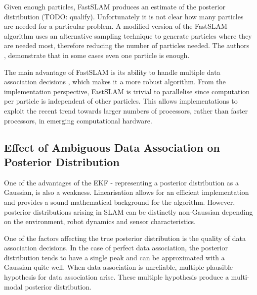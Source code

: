 Given enough particles, FastSLAM produces an estimate of the posterior
distribution (TODO: qualify). Unfortunately it is not clear how many
particles are needed for a particular problem. A modified version of
the FastSLAM algorithm \cite{fastslam2} uses an alternative sampling
technique to generate particles where they are needed most, therefore
reducing the number of particles needed. The authors \cite{fastslam2},
demonstrate that in some cases even one particle is enough.

The main advantage of FastSLAM is its ability to handle multiple data
association decisions \cite{Montemerlo2003}, which makes it a more
robust algorithm. From the implementation perspective, FastSLAM is
trivial to parallelise since computation per particle is independent
of other particles. This allows implementations to exploit the recent
trend towards larger numbers of processors, rather than faster
processors, in emerging computational hardware.

\subsection{Effect of Ambiguous Data Association on Posterior
  Distribution}
\label{sec:AmbiguousDA}

One of the advantages of the EKF - representing a posterior
distribution as a Gaussian, is also a weakness. Linearisation allows
for an efficient implementation and provides a sound mathematical
background for the algorithm. However, posterior distributions arising
in SLAM can be distinctly non-Gaussian depending on the environment,
robot dynamics and sensor characteristics.

One of the factors affecting the true posterior distribution is the
quality of data association decisions. In the case of perfect data
association, the posterior distribution tends to have a single peak
and can be approximated with a Gaussian quite well. When data
association is unreliable, multiple plausible hypothesis for data
association arise. These multiple hypothesis produce a multi-modal
posterior distribution.

